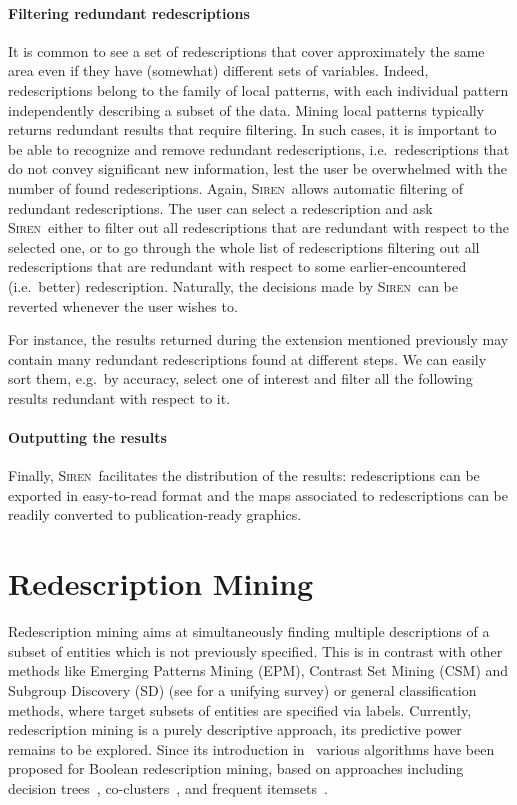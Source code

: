 \documentclass{sig-alternate}
\newcommand{\prg}[1]{\paragraph{#1}}
\newcommand{\Siren}{\textsc{Siren}}
\begin{document}
\prg{Filtering redundant redescriptions}
\label{sec:filt-redund-redescr}
It is common to see a set of redescriptions that cover approximately
the same area even if they have (somewhat) different sets of
variables.  Indeed, redescriptions belong to the family of local
patterns, with each individual pattern independently describing a
subset of the data. Mining local patterns typically returns redundant
results that require filtering.  In such cases, it is important to be
able to recognize and remove redundant redescriptions, i.e.\
redescriptions that do not convey significant new information, lest
the user be overwhelmed with the number of found
redescriptions. Again, \Siren\ allows automatic filtering of redundant
redescriptions. The user can select a redescription and ask
\Siren\ either to filter out all redescriptions that are redundant
with respect to the selected one, or to go through the whole list of
redescriptions filtering out all redescriptions that are redundant
with respect to some earlier-encountered (i.e.\ better)
redescription. Naturally, the decisions made by
\Siren\ can be reverted whenever the user wishes to.

For instance, the results returned during the extension
mentioned previously may contain many redundant redescriptions found
at different steps. We can easily sort them, e.g.\ by accuracy, select
one of interest and filter all the following results redundant with respect to it.


\prg{Outputting the results}
\label{sec:outputting-results}
Finally, \Siren\ facilitates the distribution of the results:
redescriptions can be exported in easy-to-read format and the
maps associated to redescriptions can be readily converted to
publication-ready graphics. 

\section{Redescription Mining}
\label{sec:redescription-mining}
Redescription mining aims at simultaneously finding multiple
descriptions of a subset of entities which is not previously
specified.  This is in contrast with other methods like Emerging
Patterns Mining (EPM), Contrast Set Mining (CSM) and Subgroup Discovery
(SD) (see \cite{kralj09supervised} for a unifying survey) or general
classification methods, where target subsets of entities are specified
via labels.  Currently, redescription mining is a purely descriptive
approach, its predictive power remains to be explored.  Since its
introduction in~\cite{ramakrishnan04turning} various algorithms have
been proposed for Boolean redescription mining, based on approaches
including decision
trees~\cite{ramakrishnan04turning,kumar07redescription},
co-clusters~\cite{parida05redescription}, and frequent
itemsets~\cite{gallo08finding}.
\end{document}
